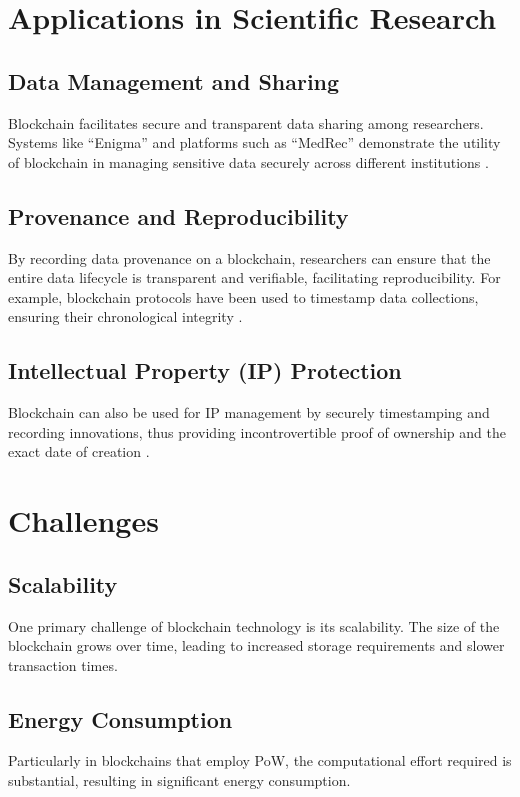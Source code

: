 \documentclass{article}
\begin{document}
\section{Applications in Scientific Research}
\subsection{Data Management and Sharing}
Blockchain facilitates secure and transparent data sharing among researchers. Systems like ``Enigma'' and platforms such as ``MedRec'' demonstrate the utility of blockchain in managing sensitive data securely across different institutions \cite{zyskind2015enigma, azaria2016medrec}.

\subsection{Provenance and Reproducibility}
By recording data provenance on a blockchain, researchers can ensure that the entire data lifecycle is transparent and verifiable, facilitating reproducibility. For example, blockchain protocols have been used to timestamp data collections, ensuring their chronological integrity \cite{dinh2018blockbench, toyoda2017proof}.

\subsection{Intellectual Property (IP) Protection}
Blockchain can also be used for IP management by securely timestamping and recording innovations, thus providing incontrovertible proof of ownership and the exact date of creation \cite{boutin2020blockchain}.

\section{Challenges}
\subsection{Scalability}
One primary challenge of blockchain technology is its scalability. The size of the blockchain grows over time, leading to increased storage requirements and slower transaction times.

\subsection{Energy Consumption}
Particularly in blockchains that employ PoW, the computational effort required is substantial, resulting in significant energy consumption.
\end{document}
